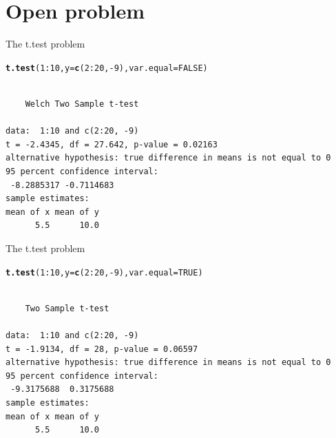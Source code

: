 \documentclass[10pt]{beamer}\usepackage[]{graphicx}\usepackage[]{color}
\makeatletter
\newcommand{\hlnum}[1]{\textcolor[rgb]{0.686,0.059,0.569}{#1}}%
\newcommand{\hlopt}[1]{\textcolor[rgb]{0,0,0}{#1}}%
\newcommand{\hlstd}[1]{\textcolor[rgb]{0.345,0.345,0.345}{#1}}%
\newcommand{\hlkwc}[1]{\textcolor[rgb]{0.333,0.667,0.333}{#1}}%
\newcommand{\hlkwd}[1]{\textcolor[rgb]{0.737,0.353,0.396}{\textbf{#1}}}%
\newenvironment{kframe}{%
 \def\at@end@of@kframe{}%
 \ifinner\ifhmode%
  \def\at@end@of@kframe{\end{minipage}}%
  \begin{minipage}{\columnwidth}%
 \fi\fi%
 \def\FrameCommand##1{\hskip\@totalleftmargin \hskip-\fboxsep
 \colorbox{shadecolor}{##1}\hskip-\fboxsep
     \hskip-\linewidth \hskip-\@totalleftmargin \hskip\columnwidth}%
 \MakeFramed {\advance\hsize-\width
   \@totalleftmargin\z@ \linewidth\hsize
   \@setminipage}}%
 {\par\unskip\endMakeFramed%
 \at@end@of@kframe}
\newenvironment{knitrout}{}{} %
\makeatother
\begin{document}
\section{Open problem}

\begin{frame}[fragile]{The t.test problem}
  
\begin{knitrout}
\color{fgcolor}\begin{kframe}
\begin{alltt}
\hlkwd{t.test}\hlstd{(}\hlnum{1}\hlopt{:}\hlnum{10}\hlstd{,} \hlkwc{y} \hlstd{=} \hlkwd{c}\hlstd{(}\hlnum{2}\hlopt{:}\hlnum{20}\hlstd{,}\hlopt{-}\hlnum{9}\hlstd{),} \hlkwc{var.equal} \hlstd{=} \hlnum{FALSE}\hlstd{)}
\end{alltt}
\begin{verbatim}

	Welch Two Sample t-test

data:  1:10 and c(2:20, -9)
t = -2.4345, df = 27.642, p-value = 0.02163
alternative hypothesis: true difference in means is not equal to 0
95 percent confidence interval:
 -8.2885317 -0.7114683
sample estimates:
mean of x mean of y 
      5.5      10.0 
\end{verbatim}
\end{kframe}
\end{knitrout}
\end{frame}

\begin{frame}[fragile]{The t.test problem}
\begin{knitrout}
\color{fgcolor}\begin{kframe}
\begin{alltt}
\hlkwd{t.test}\hlstd{(}\hlnum{1}\hlopt{:}\hlnum{10}\hlstd{,} \hlkwc{y} \hlstd{=} \hlkwd{c}\hlstd{(}\hlnum{2}\hlopt{:}\hlnum{20}\hlstd{,}\hlopt{-}\hlnum{9}\hlstd{),} \hlkwc{var.equal} \hlstd{=} \hlnum{TRUE}\hlstd{)}
\end{alltt}
\begin{verbatim}

	Two Sample t-test

data:  1:10 and c(2:20, -9)
t = -1.9134, df = 28, p-value = 0.06597
alternative hypothesis: true difference in means is not equal to 0
95 percent confidence interval:
 -9.3175688  0.3175688
sample estimates:
mean of x mean of y 
      5.5      10.0 
\end{verbatim}
\end{kframe}
\end{knitrout}
 
\end{frame}
\end{document}
